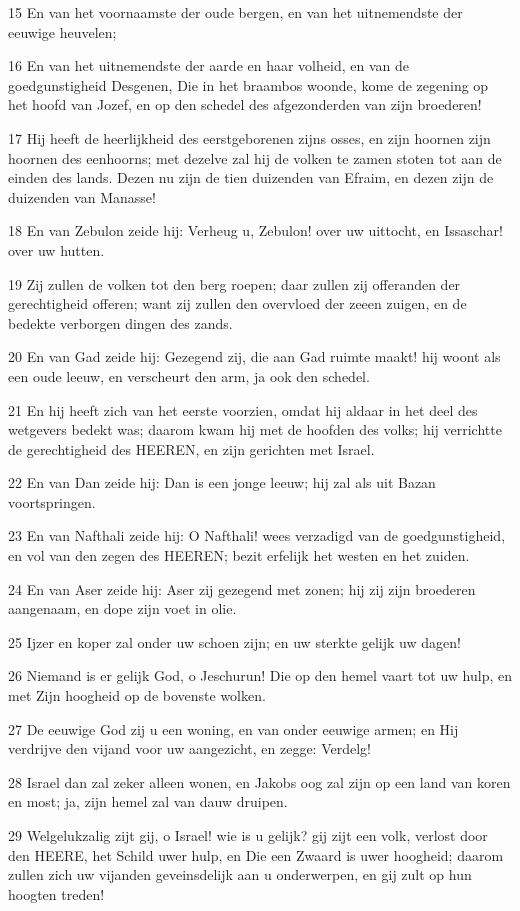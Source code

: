 \par 15 En van het voornaamste der oude bergen, en van het uitnemendste der eeuwige heuvelen;
\par 16 En van het uitnemendste der aarde en haar volheid, en van de goedgunstigheid Desgenen, Die in het braambos woonde, kome de zegening op het hoofd van Jozef, en op den schedel des afgezonderden van zijn broederen!
\par 17 Hij heeft de heerlijkheid des eerstgeborenen zijns osses, en zijn hoornen zijn hoornen des eenhoorns; met dezelve zal hij de volken te zamen stoten tot aan de einden des lands. Dezen nu zijn de tien duizenden van Efraim, en dezen zijn de duizenden van Manasse!
\par 18 En van Zebulon zeide hij: Verheug u, Zebulon! over uw uittocht, en Issaschar! over uw hutten.
\par 19 Zij zullen de volken tot den berg roepen; daar zullen zij offeranden der gerechtigheid offeren; want zij zullen den overvloed der zeeen zuigen, en de bedekte verborgen dingen des zands.
\par 20 En van Gad zeide hij: Gezegend zij, die aan Gad ruimte maakt! hij woont als een oude leeuw, en verscheurt den arm, ja ook den schedel.
\par 21 En hij heeft zich van het eerste voorzien, omdat hij aldaar in het deel des wetgevers bedekt was; daarom kwam hij met de hoofden des volks; hij verrichtte de gerechtigheid des HEEREN, en zijn gerichten met Israel.
\par 22 En van Dan zeide hij: Dan is een jonge leeuw; hij zal als uit Bazan voortspringen.
\par 23 En van Nafthali zeide hij: O Nafthali! wees verzadigd van de goedgunstigheid, en vol van den zegen des HEEREN; bezit erfelijk het westen en het zuiden.
\par 24 En van Aser zeide hij: Aser zij gezegend met zonen; hij zij zijn broederen aangenaam, en dope zijn voet in olie.
\par 25 Ijzer en koper zal onder uw schoen zijn; en uw sterkte gelijk uw dagen!
\par 26 Niemand is er gelijk God, o Jeschurun! Die op den hemel vaart tot uw hulp, en met Zijn hoogheid op de bovenste wolken.
\par 27 De eeuwige God zij u een woning, en van onder eeuwige armen; en Hij verdrijve den vijand voor uw aangezicht, en zegge: Verdelg!
\par 28 Israel dan zal zeker alleen wonen, en Jakobs oog zal zijn op een land van koren en most; ja, zijn hemel zal van dauw druipen.
\par 29 Welgelukzalig zijt gij, o Israel! wie is u gelijk? gij zijt een volk, verlost door den HEERE, het Schild uwer hulp, en Die een Zwaard is uwer hoogheid; daarom zullen zich uw vijanden geveinsdelijk aan u onderwerpen, en gij zult op hun hoogten treden!

